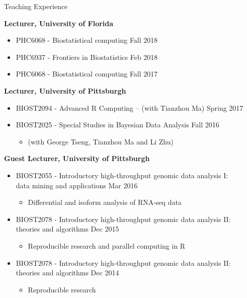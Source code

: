 \documentclass{resume} %
\begin{document}


\begin{rSection}{Teaching Experience }

\textbf{Lecturer, University of Florida}
\begin{itemize}[noitemsep,topsep=0pt]
\item PHC6068 - Biostatistical computing \hfill Fall 2018
\item PHC6937 - Frontiers in Biostatistics \hfill Feb 2018
\item PHC6068 - Biostatistical computing \hfill Fall 2017
\end{itemize}


\textbf{Lecturer, University of Pittsburgh}
\begin{itemize}[noitemsep,topsep=0pt]
\item BIOST2094 - Advanced R Computing -- (with Tianzhou Ma) \hfill Spring 2017
\item BIOST2025 - Special Studies in Bayesian Data Analysis  \hfill Fall 2016
\begin{itemize}[noitemsep,topsep=0pt]
\item{(with George Tseng, Tianzhou Ma and Li Zhu)}
\end{itemize}
\end{itemize}


\textbf{Guest Lecturer, University of Pittsburgh}
\begin{itemize}[noitemsep,topsep=0pt]
\item BIOST2055 - Introductory high-throughput genomic data analysis I: \\data mining and applications \hfill Mar 2016
\begin{itemize}[noitemsep,topsep=0pt]
\item{Differential and isoform analysis of RNA-seq data}
\end{itemize}
\item BIOST2078 - Introductory high-throughput genomic data analysis II: \\theories and algorithms  \hfill Dec 2015
\begin{itemize}[noitemsep,topsep=0pt]
\item{Reproducible research and parallel computing in R}
\end{itemize}
\item BIOST2078 - Introductory high-throughput genomic data analysis II: \\theories and algorithms  \hfill Dec 2014
\begin{itemize}[noitemsep,topsep=0pt]
\item{Reproducible research}
\end{itemize}
\end{itemize}


\end{rSection}
\end{document}
